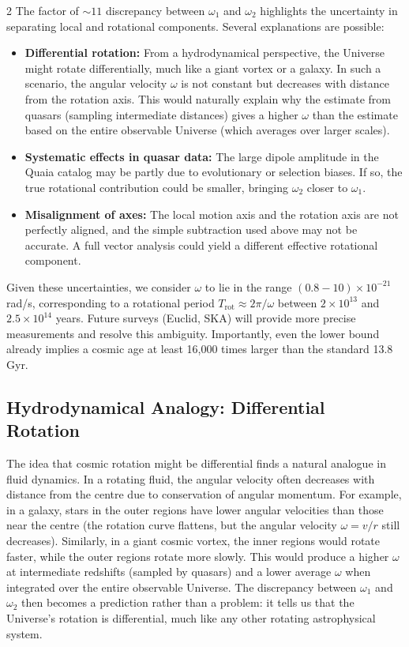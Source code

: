 \documentclass[12pt,a4paper]{article}
\begin{document}
\begin{multicols}{2}
		The factor of \(\sim11\) discrepancy between \(\omega_1\) and \(\omega_2\) highlights the uncertainty in separating local and rotational components. Several explanations are possible:
		\begin{itemize}
			\item \textbf{Differential rotation:} From a hydrodynamical perspective, the Universe might rotate differentially, much like a giant vortex or a galaxy. In such a scenario, the angular velocity \(\omega\) is not constant but decreases with distance from the rotation axis. This would naturally explain why the estimate from quasars (sampling intermediate distances) gives a higher \(\omega\) than the estimate based on the entire observable Universe (which averages over larger scales).
			\item \textbf{Systematic effects in quasar data:} The large dipole amplitude in the Quaia catalog may be partly due to evolutionary or selection biases. If so, the true rotational contribution could be smaller, bringing \(\omega_2\) closer to \(\omega_1\).
			\item \textbf{Misalignment of axes:} The local motion axis and the rotation axis are not perfectly aligned, and the simple subtraction used above may not be accurate. A full vector analysis could yield a different effective rotational component.
		\end{itemize}
		Given these uncertainties, we consider \(\omega\) to lie in the range \((0.8-10)\times10^{-21}\) rad/s, corresponding to a rotational period \(T_{\text{rot}} \approx 2\pi/\omega\) between \(2\times10^{13}\) and \(2.5\times10^{14}\) years. Future surveys (Euclid, SKA) will provide more precise measurements and resolve this ambiguity. Importantly, even the lower bound already implies a cosmic age at least 16,000 times larger than the standard 13.8 Gyr.
		
		\subsection{Hydrodynamical Analogy: Differential Rotation}
		
		The idea that cosmic rotation might be differential finds a natural analogue in fluid dynamics. In a rotating fluid, the angular velocity often decreases with distance from the centre due to conservation of angular momentum. For example, in a galaxy, stars in the outer regions have lower angular velocities than those near the centre (the rotation curve flattens, but the angular velocity \(\omega = v/r\) still decreases). Similarly, in a giant cosmic vortex, the inner regions would rotate faster, while the outer regions rotate more slowly. This would produce a higher \(\omega\) at intermediate redshifts (sampled by quasars) and a lower average \(\omega\) when integrated over the entire observable Universe. The discrepancy between \(\omega_1\) and \(\omega_2\) then becomes a prediction rather than a problem: it tells us that the Universe's rotation is differential, much like any other rotating astrophysical system.
		

\end{multicols}
\end{document}
